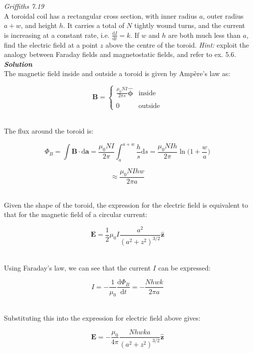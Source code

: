 \documentclass[9pt]{extarticle}
\renewcommand{\v}[1]{{\bm #1}}
\newcommand{\hv}[1]{\hat{\bm{#1}}}
\newcommand{\bfit}[1]{\textbf{\textit{#1}}}
\renewcommand{\d}{\text{d}}
\newcommand{\ddt}[1]{\frac{\d #1}{\d t}}
\newcommand{\muo}{\mu_0}
\begin{document}
\begin{multicols*}{2}
{\it Griffiths 7.19} \\ 

A toroidal coil has a rectangular cross section, with inner radius $a$, outer radius $a+w$, and height $h$. It carries a total of $N$ tightly wound turns, and the current is increasing at a constant rate,  i.e. $\ddt I = k$. If $w$ and $h$ are both much less than $a$, find the electric field at a point $z$ above the centre of the toroid. {\it Hint:} exploit the analogy between Faraday fields and magnetostatic fields, and refer to ex. 5.6. \\ 

{\bfit{Solution}} \\ 

The magnetic field inside and outside a toroid is given by Ampère's law as:

$$\v B = 
\begin{cases}
	\frac{\muo NI}{2\pi s} \hv \phi & \text{inside} \\ 
	\\ 
	0 & \text{outside} 
\end{cases}
$$ \ 

The flux around the toroid is:

$$\Phi_B = \int \v B \cdot \d \v a = \frac{\muo NI}{2\pi} \int_a^{a+w} \frac hs \d s =  \frac{\muo NI h}{2\pi} \ln \bigg( 1 + \frac wa \bigg)$$

$$\approx \frac{\muo NIhw}{2\pi a}$$ \ 

Given the shape of the toroid, the expression for the electric field is equivalent to that for the magnetic field of a circular current:

$$\v E = \frac 12 \muo  I \frac{a^2}{(a^2+z^2)^{3/2}} \hv z$$ \ 

Using Faraday's law, we can see that the current $I$ can be expressed:

$$I  = -\frac{1}{\muo} \ddt{\Phi_B} = -\frac{Nhwk}{2\pi a}$$ \ 

Substituting this into the expression for electric field above gives:

$$\v E = -\frac{\muo}{4\pi} \frac{Nhwka}{(a^2+z^2)^{3/2}} \hv z$$ \ 

\end{multicols*}
\end{document}
